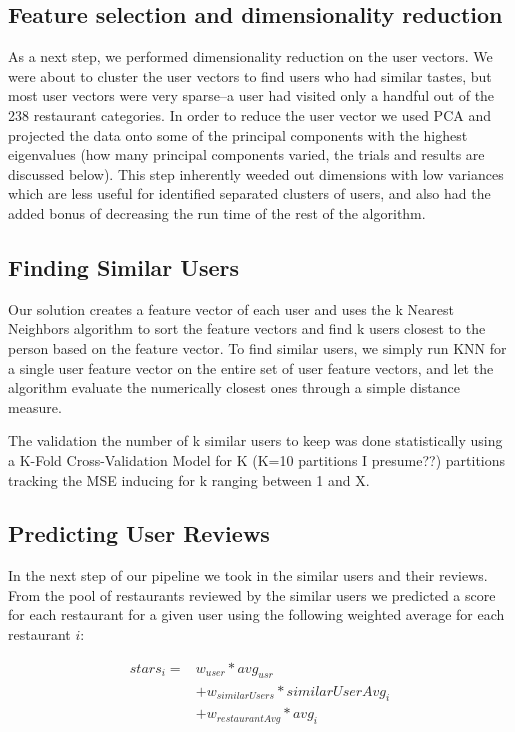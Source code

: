 \documentclass[10pt,twocolumn,letterpaper]{article}
\newcommand{\wu}{\ensuremath{w_{user}}}
\newcommand{\ws}{\ensuremath{w_{similarUsers}}}
\newcommand{\wrst}{\ensuremath{w_{restaurantAvg}}}
\begin{document}
\subsection{Feature selection and dimensionality reduction}
As a next step, we performed dimensionality reduction on the user vectors. We were about to cluster the user vectors to find users who had similar tastes, but most user vectors were very sparse--a user had visited only a handful out of the 238 restaurant categories. In order to reduce the user vector we used PCA and projected the data onto some of the principal components with the highest eigenvalues (how many principal components varied, the trials and results are discussed below). This step inherently weeded out dimensions with low variances which are less useful for identified separated clusters of users, and also had the added bonus of decreasing the run time of the rest of the algorithm. 

\subsection{Finding Similar Users}
Our solution creates a feature vector of each user and uses the k Nearest Neighbors algorithm to sort the feature vectors and find k users closest to the person based on the feature vector. To find similar users, we simply run KNN for a single user feature vector on the entire set of user feature vectors, and let the algorithm evaluate the numerically closest ones through a simple distance measure. 

The validation the number of k similar users to keep was done statistically using a K-Fold Cross-Validation Model for K (K=10 partitions I presume??) partitions tracking the MSE inducing for k ranging between 1 and X. 

\subsection{Predicting User Reviews}
In the next step of our pipeline we took in the similar users and their reviews. From the pool of restaurants reviewed by the similar users we predicted a score for each restaurant for a given user using the following weighted average for each restaurant $i$:

\begin{align*}
stars_{i} = & \wu * avg_{usr}\\
&+ \ws * similarUserAvg_{i}\\
&+ \wrst * avg_{i}
\end{align*}
\end{document}
